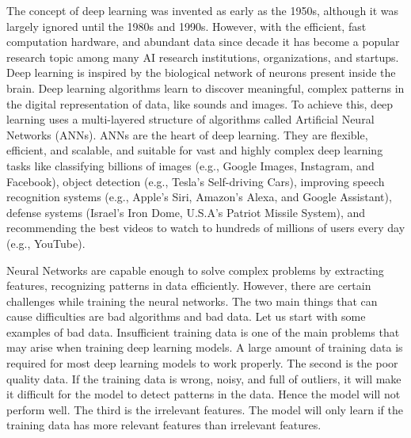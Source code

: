 The concept of deep learning was invented as early as the 1950s, although it was largely ignored until the 1980s and 1990s. However, with the efficient, fast computation hardware, and abundant data since decade it has become a popular research topic among many \ac{AI} research institutions, organizations, and startups. Deep learning is inspired by the biological network of neurons present inside the brain. Deep learning algorithms learn to discover meaningful, complex patterns in the digital representation of data, like sounds and images. To achieve this, deep learning uses a multi-layered structure of algorithms called Artificial Neural Networks (\acp{ANN}). \acp{ANN} are the heart of deep learning. They are flexible, efficient, and scalable, and suitable for vast and highly complex deep learning tasks like classifying billions of images (e.g., Google Images, Instagram, and Facebook), object detection (e.g., Tesla's Self-driving Cars), improving speech recognition systems (e.g., Apple's Siri, Amazon's Alexa, and Google Assistant), defense systems (Israel's Iron Dome, U.S.A's Patriot Missile System), and recommending the best videos to watch to hundreds of millions of users every day (e.g., YouTube).

Neural Networks are capable enough to solve complex problems by extracting features, recognizing patterns in data efficiently. However, there are certain challenges while training the neural networks. The two main things that can cause difficulties are bad algorithms and bad data. Let us start with some examples of bad data. Insufficient training data is one of the main problems that may arise when training deep learning models. A large amount of training data is required for most deep learning models to work properly. The second is the poor quality data. If the training data is wrong, noisy, and full of outliers, it will make it difficult for the model to detect patterns in the data. Hence the model will not perform well. The third is the irrelevant features. The model will only learn if the training data has more relevant features than irrelevant features. 


